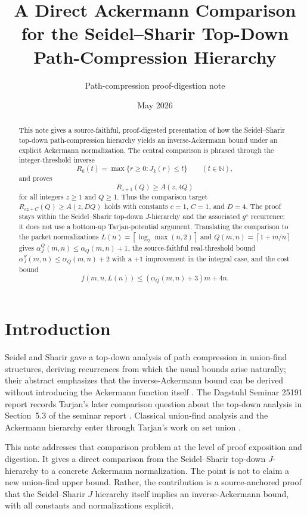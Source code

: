 ﻿\documentclass[11pt]{article}
\title{A Direct Ackermann Comparison for the Seidel--Sharir Top-Down Path-Compression Hierarchy}
\author{Path-compression proof-digestion note}
\date{May 2026}
\newcommand{\N}{\mathbb{N}}
\newcommand{\ceil}[1]{\left\lceil #1 \right\rceil}
\newcommand{\alphaQ}{\alpha_Q}
\newcommand{\alphaJQ}{\alpha_J^Q}
\newcommand{\alphaJS}{\alpha_J^S}
\begin{document}
\maketitle

\begin{abstract}
This note gives a source-faithful, proof-digested presentation of how the Seidel--Sharir top-down path-compression hierarchy yields an inverse-Ackermann bound under an explicit Ackermann normalization.  The central comparison is phrased through the integer-threshold inverse
\[
R_k(t)=\max\{r\ge 0:J_k(r)\le t\}\qquad(t\in\N),
\]
and proves
\[
R_{z+1}(Q)\ge A(z,4Q)
\]
for all integers $z\ge 1$ and $Q\ge 1$.  Thus the comparison target $R_{cz+C}(Q)\ge A(z,DQ)$ holds with constants $c=1$, $C=1$, and $D=4$.  The proof stays within the Seidel--Sharir top-down $J$-hierarchy and the associated $g^\diamond$ recurrence; it does not use a bottom-up Tarjan-potential argument.  Translating the comparison to the packet normalizations $L(n)=\ceil{\log_2\max(n,2)}$ and $Q(m,n)=\ceil{1+m/n}$ gives $\alphaJQ(m,n)\le \alphaQ(m,n)+1$, the source-faithful real-threshold bound $\alphaJS(m,n)\le\alphaQ(m,n)+2$ with a $+1$ improvement in the integral case, and the cost bound
\[
f(m,n,L(n))\le (\alphaQ(m,n)+3)m+4n.
\]
\end{abstract}

\section{Introduction}

Seidel and Sharir gave a top-down analysis of path compression in union-find structures, deriving recurrences from which the usual bounds arise naturally; their abstract emphasizes that the inverse-Ackermann bound can be derived without introducing the Ackermann function itself \cite{SeidelSharir2005}.  The Dagstuhl Seminar 25191 report records Tarjan's later comparison question about the top-down analysis in Section~5.3 of the seminar report \cite{BenderEtAlDagstuhl25191}.  Classical union-find analysis and the Ackermann hierarchy enter through Tarjan's work on set union \cite{Tarjan1975}.

This note addresses that comparison problem at the level of proof exposition and digestion.  It gives a direct comparison from the Seidel--Sharir top-down $J$-hierarchy to a concrete Ackermann normalization.  The point is not to claim a new union-find upper bound.  Rather, the contribution is a source-anchored proof that the Seidel--Sharir $J$ hierarchy itself implies an inverse-Ackermann bound, with all constants and normalizations explicit.
\end{document}
